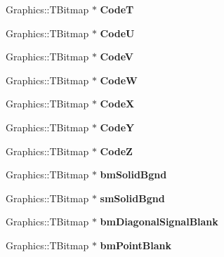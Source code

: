 \begin{DoxyCompactItemize}
Graphics\+::\+T\+Bitmap $\ast$ {\bfseries CodeT}
\item 
\mbox{\label{class_t_rail_graphics_a94f75c906ca3c27335900db59dcad130}} 
Graphics\+::\+T\+Bitmap $\ast$ {\bfseries CodeU}
\item 
\mbox{\label{class_t_rail_graphics_a515bc12c5dd6502bdc3dc739c232451b}} 
Graphics\+::\+T\+Bitmap $\ast$ {\bfseries CodeV}
\item 
\mbox{\label{class_t_rail_graphics_a0852d8d922df27883b6cc92186308f2c}} 
Graphics\+::\+T\+Bitmap $\ast$ {\bfseries CodeW}
\item 
\mbox{\label{class_t_rail_graphics_ac63b8ebf3855d1b0aaded4e25ff5f838}} 
Graphics\+::\+T\+Bitmap $\ast$ {\bfseries CodeX}
\item 
\mbox{\label{class_t_rail_graphics_ac9e07b25e61402e9e4bfffdbb940eaf7}} 
Graphics\+::\+T\+Bitmap $\ast$ {\bfseries CodeY}
\item 
\mbox{\label{class_t_rail_graphics_ab78fcf82124f6179d3ed6a9b4173653e}} 
Graphics\+::\+T\+Bitmap $\ast$ {\bfseries CodeZ}
\item 
\mbox{\label{class_t_rail_graphics_ab497983d1bc5230e83e71688012fda96}} 
Graphics\+::\+T\+Bitmap $\ast$ {\bfseries bm\+Solid\+Bgnd}
\item 
\mbox{\label{class_t_rail_graphics_a1a5f8cf3c2e5cac7e8a7b58a9fca0de1}} 
Graphics\+::\+T\+Bitmap $\ast$ {\bfseries sm\+Solid\+Bgnd}
\item 
\mbox{\label{class_t_rail_graphics_a6ca519bd7e95d5436c2f7c2886bcb880}} 
Graphics\+::\+T\+Bitmap $\ast$ {\bfseries bm\+Diagonal\+Signal\+Blank}
\item 
\mbox{\label{class_t_rail_graphics_a8edd1550f94d08a5125de2b182428081}} 
Graphics\+::\+T\+Bitmap $\ast$ {\bfseries bm\+Point\+Blank}
\item 
\mbox{\label{class_t_rail_graphics_a2072c6206721542f520636a4c9095f9f}} 

\end{DoxyCompactItemize}
